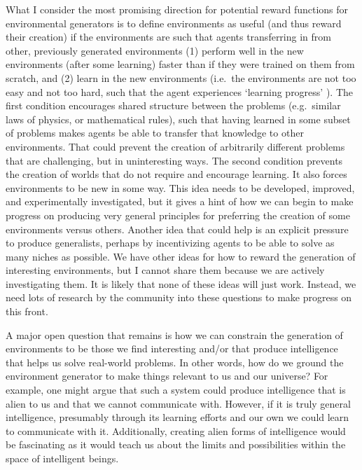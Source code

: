 \documentclass{article}
\begin{document}
What I consider the most promising direction for potential reward functions for environmental generators is to define environments as useful (and thus reward their creation) if the environments are such that agents transferring in from other, previously generated environments (1) perform well in the new environments (after some learning) faster than if they were trained on them from scratch, and (2) learn in the new environments (i.e.\ the environments are not too easy and not too hard, such that the agent experiences `learning progress' \cite{schmidhuber1991curious}). The first condition encourages shared structure between the problems (e.g.\ similar laws of physics, or mathematical rules), such that having learned in some subset of problems makes agents be able to transfer that knowledge to other environments. That could prevent the creation of arbitrarily different problems that are challenging, but in uninteresting ways. The second condition prevents the creation of worlds that do not require and encourage learning. It also forces environments to be new in some way. This idea needs to be developed, improved, and experimentally investigated, but it gives a hint of how we can begin to make progress on producing very general principles for preferring the creation of some environments versus others. Another idea that could help is an explicit pressure to produce generalists, perhaps by incentivizing agents to be able to solve as many niches as possible. We have other ideas for how to reward the generation of interesting environments, but I cannot share them because we are actively investigating them. It is likely that none of these ideas will just work. Instead, we need lots of research by the community into these questions to make progress on this front. 

A major open question that remains is how we can constrain the generation of environments to be those we find interesting and/or that produce intelligence that helps us solve real-world problems. In other words, how do we ground the environment generator to make things relevant to us and our universe? For example, one might argue that such a system could produce intelligence that is alien to us and that we cannot communicate with. However, if it is truly general intelligence, presumably through its learning efforts and our own we could learn to communicate with it. Additionally, creating alien forms of intelligence would be fascinating as it would teach us about the limits and possibilities within the space of intelligent beings. 
\end{document}
